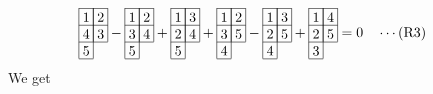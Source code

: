 \begin{align*}
\begin{array}[c]{*{2}c}\cline{1-2}
\lr{1}&\lr{2}\\\cline{1-2}
\lr{4}&\lr{3}\\\cline{1-2}
\lr{5}\\\cline{1-1}
\end{array}
-\begin{array}[c]{*{2}c}\cline{1-2}
\lr{1}&\lr{2}\\\cline{1-2}
\lr{3}&\lr{4}\\\cline{1-2}
\lr{5}\\\cline{1-1}
\end{array}
+\begin{array}[c]{*{2}c}\cline{1-2}
\lr{1}&\lr{3}\\\cline{1-2}
\lr{2}&\lr{4}\\\cline{1-2}
\lr{5}\\\cline{1-1}
\end{array}
+\begin{array}[c]{*{2}c}\cline{1-2}
\lr{1}&\lr{2}\\\cline{1-2}
\lr{3}&\lr{5}\\\cline{1-2}
\lr{4}\\\cline{1-1}
\end{array}
-\begin{array}[c]{*{2}c}\cline{1-2}
\lr{1}&\lr{3}\\\cline{1-2}
\lr{2}&\lr{5}\\\cline{1-2}
\lr{4}\\\cline{1-1}
\end{array}
+\begin{array}[c]{*{2}c}\cline{1-2}
\lr{1}&\lr{4}\\\cline{1-2}
\lr{2}&\lr{5}\\\cline{1-2}
\lr{3}\\\cline{1-1}
\end{array}
&=0 &&\cdots (\text{R3})
\end{align*}
We get

